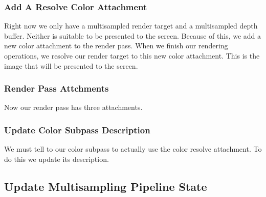 \subsubsection{Add A Resolve Color Attachment}

Right now we only have a multisampled render target and a multisampled
depth buffer.
Neither is suitable to be presented to the screen.
Because of this, we add a new color attachment to the render pass.
When we finish our rendering operations, we resolve our render target to
this new color attachment.
This is the image that will be presented to the screen.

\begin{minipage}{\linewidth}{\noindent}
    
\end{minipage}

\subsubsection{Render Pass Attchments}

Now our render pass has three attachments.

\begin{minipage}{\linewidth}{\noindent}
    
\end{minipage}

\subsubsection{Update Color Subpass Description}

We must tell to our color subpass to actually use the color resolve attachment.
To do this we update its description.

\begin{minipage}{\linewidth}{\noindent}
    
\end{minipage}

\subsection{Update Multisampling Pipeline State}

